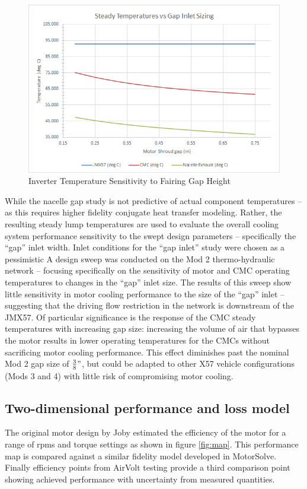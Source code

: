 \documentclass[]{aiaa-tc}%
\begin{document}
\begin{figure}[!htb]%
	\centering
	\includegraphics[width=.75\textwidth]{figures/gapsweep_results.png}
	\caption{Inverter Temperature Sensitivity to Fairing Gap Height}
	\label{fig:GapSweep}
\end{figure}

While the nacelle gap study is not predictive of actual component temperatures – as this requires higher fidelity conjugate heat transfer modeling.  Rather, the resulting steady lump temperatures are used to evaluate the overall cooling system performance sensitivity to the swept design parameters – specifically the “gap” inlet width.  Inlet conditions for the “gap inlet” study were chosen as a pessimistic  
A design sweep was conducted on the Mod 2 thermo-hydraulic network – focusing specifically on the sensitivity of motor and CMC operating temperatures to changes in the “gap” inlet size.  
The results of this sweep show little sensitivity in motor cooling performance to the size of the “gap” inlet – suggesting that the driving flow restriction in the network is downstream of the JMX57.  Of particular significance is the response of the CMC steady temperatures with increasing gap size:  increasing the volume of air that bypasses the motor results in lower operating temperatures for the CMCs without sacrificing motor cooling performance.  This effect diminishes past the nominal Mod 2 gap size of $\frac{3}{8}"$, but could be adapted to other X57 vehicle configurations (Mods 3 and 4) with little risk of compromising motor cooling. 


\subsection{Two-dimensional performance and loss model}

The original motor design by Joby \cite{Dubois2016} estimated the efficiency of the motor for a range of rpms and torque settings as shown in figure \ref{fig:map}. This performance map is compared against a similar fidelity model developed in MotorSolve. Finally efficiency points from AirVolt testing provide a third comparison point showing achieved performance with uncertainty from measured quantities.
\end{document}
